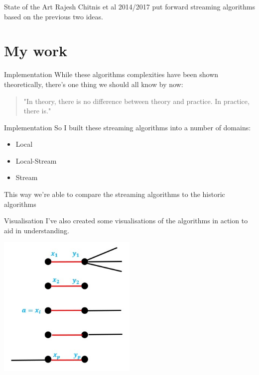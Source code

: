 \documentclass{beamer}
\begin{document}
\begin{frame}{State of the Art}
    Rajesh Chitnis et al 2014/2017 put forward streaming algorithms based on the previous two ideas.
\end{frame}

\section{My work}

\begin{frame}{Implementation}
    While these algorithms complexities have been shown theoretically, there's one thing we should all know by now:

    \hfill

    \begin{quote}
        "In theory, there is no difference between theory and practice. In practice, there is."
    \end{quote}
\end{frame}

\begin{frame}{Implementation}
    So I built these streaming algorithms into a number of domains:

    \begin{itemize}
        \item Local
        \item Local-Stream
        \item Stream
    \end{itemize}

    This way we're able to compare the streaming algorithms to the historic algorithms
\end{frame}

\begin{frame}{Visualisation}
    I've also created some visualisations of the algorithms in action to aid in understanding.

    \includegraphics[width=0.5\textwidth]{1-pass}
\end{frame}
\end{document}

